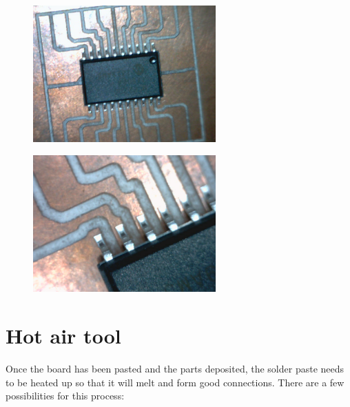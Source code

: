 \begin{figure}
\centering
\begin{minipage}{.5\textwidth}
	\centering
	\includegraphics[width=70mm]{resources/breakout.png}
	\label{breakout}
\end{minipage}%
\hfill
\begin{minipage}{.5\textwidth}
	\centering
	\includegraphics[width=70mm]{resources/breakout_closeup.png}
	\label{breakout_closeup}
\end{minipage}%
\end{figure}




\section{Hot air tool}
\label{lastsection}
Once the board has been pasted and the parts deposited, the solder paste needs to be heated up so that it will melt and form good connections.
There are a few possibilities for this process:

